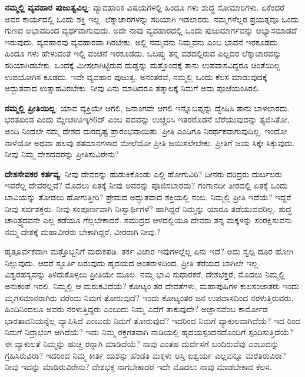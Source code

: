 \textbf{ನಮ್ಮಲ್ಲಿ ವ್ಯವಹಾರ ಪುಜುತ್ವವಿಲ್ಲ}: ವ್ಯಾವಹಾರಿಕ ವಿಷಯಗಳಲ್ಲಿ ಹಿಂದೂ ಗಳು ಶುದ್ಧ ಸೋಮಾರಿಗಳು. ಏಕೆಂದರೆ ಅವರ ಕಾರ್ಯದಲ್ಲಿ ಒಂದು ಶಕ್ತಿ ಇಲ್ಲ. ಲೆಕ್ಕಾಚಾರಗಳನ್ನು ಸರಿಯಾಗಿ ಇಡಲಾರರು. ನಮ್ಮಗಳೆಲ್ಲರ ಪ್ರಯತ್ನವೂ ಒಂದು ಗುಣದ ಅಭಾವದಿಂದ ವ್ಯರ್ಥವಾಗುವುದು. ಅದೇ ನಾವು ವ್ಯವಹಾರದಲ್ಲಿ ಒಂದು ಪುಜುಮಾರ್ಗವನ್ನು ಅಭ್ಯಾಸಮಾಡದೆ ಇರುವುದು. ವ್ಯವಹಾರವು ವ್ಯವಹಾರವಾ ಗಿರಬೇಕು. ಅಲ್ಲಿ ನಮ್ಮವನು ನಿಮ್ಮವನು ಎಂಬ ಭಾವನೆ ಇರಕೂಡದು. ಹಿಂದೂ ಗಳು ಹೇಳುವಂತೆ ಇಲ್ಲಿ ವಂಚನೆ ಇರಕೂಡದು. ಒಬಪ್ನು ತನ್ನ ವಶದಲ್ಲಿರುವ ಎಲ್ಲದರ ಲೆಕ್ಕಾಚಾರವನ್ನು ಸರಿಯಾಗಿಡಬೇಕು. ಒಂದಕ್ಕೆ ಮೀಸಲಾಗಿಟ್ಟಿರುವ ದುಡ್ಡನ್ನು ಮತ್ತೊಂದಕ್ಕೆ ತಾನು ಉಪವಾಸವಿದ್ದರೂ ಚಿಂತೆಯಿಲ್ಲ ಉಪಯೋಗಿಸ ಕೂಡದು. ಇದೇ ವ್ಯವಹಾರ ಪುಜುತ್ವ. ಅನಂತರವೆ, ನಮ್ಮಲ್ಲಿ ಒಂದು ಕೆಲಸ ಮಾಡುವುದಕ್ಕೆ ಅದ್ಭುತವಾದ ಉತ್ಸಾಹವಿರಬೇಕು. ನೀವು ಏನು ಮಾಡಿದರೂ ತತ್ಕಾಲಕ್ಕೆ ನಿಮಗೆ ಅದು ಪೂಜೆಯಂತಿರಲಿ.

\textbf{ನಮ್ಮಲ್ಲಿ ಪ್ರೀತಿಯಿಲ್ಲ}: ಯಾವ ವ್ಯಕ್ತಿಯೇ ಆಗಲಿ, ಜನಾಂಗವೇ ಆಗಲಿ ಇನ್ನೊಬಪ್ನನ್ನು ದ್ವೇಷಿಸಿ ತಾನು ಬಾಳಲಾರದು. ಭರತಖಂಡ ಎಂದು ಮ್ಲೇಚಊಇ್ಕ86ದ್ ಎಂಬ ಪದವನ್ನು ಉಚ್ಚರಿಸಿ ಇತರರೊಡನೆ ಬೆರೆಯುವುದನ್ನು ತ್ಯಜಿಸಿತೋ, ಅಂದಿ ನಿಂದಲೇ ನಮ್ಮ ದೇಶದ ದುರದೃಷ್ಟ ಪ್ರಾರಂಭವಾಯಿತು. ಪ್ರೀತಿ ಎಂದಿಗೂ ನಿರರ್ಥಕವಾಗುವುದಿಲ್ಲ. ಇಂದೋ ನಾಳೆಯೋ ಅಥವಾ ಹಲವು ಶತಮಾನಗಳಾದ ಮೇಲೆಯೋ ಪ್ರೀತಿ ಜಯಿಸಲೇಬೇಕು. ಪ್ರೀತಿಗೆ ಜಯ ಸಿಕ್ಕೇ ಸಿಕ್ಕುವುದು. ನೀವು ನಿಮ್ಮ ದೇಶದವರನ್ನು ಪ್ರೀತಿಸುವಿರೇನು?

\textbf{ದೇಶಸೇವಕರ ಕರ್ತವ್ಯ}: ನೀವು ದೇವರನ್ನು ಹುಡುಕಿಕೊಂಡು ಎಲ್ಲಿ ಹೋಗುವಿರಿ? ದೀನರು ದರಿದ್ರರು ದುರ್ಬಲರು ಇವರೆಲ್ಲ ದೇವರಲ್ಲವೆ? ಮೊದಲು ಏತಕ್ಕೆ ನೀವು ಅವರನ್ನು ಪೂಜಿಸಬಾರದು? ಗಂಗಾನದೀ ತೀರದಲ್ಲಿ ಏತಕ್ಕೆ ಒಂದು ಬಾವಿಯನ್ನು ತೋಡಲು ಹೋಗುತ್ತೀರಿ? ಪ್ರೇಮದ ಅದ್ಭುತವಾದ ಶಕ್ತಿಯಲ್ಲಿ ನಂಬಿ. ನಿಮ್ಮಲ್ಲಿ ಪ್ರೀತಿ ಇದೆಯೆ? ಇದ್ದರೆ ನೀವು ಸರ್ವಶಕ್ತರು. ನೀವು ಸಂಪೂರ್ಣವಾಗಿ ನಿಃಸ್ವಾರ್ಥಿಗಳೆ? ಹಾಗಿದ್ದರೆ ನಿಮ್ಮನ್ನು ಯಾರೂ ತಡೆಯುವವರಿಲ್ಲ. ಶುದ್ಧ ಚಾರಿತ್ರ್ಯದವನೇ ಎಲ್ಲ ಕಡೆಯೂ ಗೆಲ್ಲಬೇಕಾದರೆ. ಸಮುದ್ರದ ಆಳದಲ್ಲಿಯೂ ದೇವರು ತನ್ನ ಮಕ್ಕಳನ್ನು ಸಂರಕ್ಷಿಸುವನು. ನಮ್ಮ ದೇಶಕ್ಕೆ ಮಹಾವೀರರು ಬೇಕಾಗಿದ್ದರೆ, ವೀರರಾಗಿ ನೀವು.?

ಹೃತ್ಪೂರ್ವಕವಾಗಿ ಮತ್ತೊಬ್ಬನಿಗೆ ಮರುಕಪಡಿ. ತರ್ಕ ವಿಚಾರ ಇವುಗಳಲ್ಲೆಲ್ಲ ಏನು ಇದೆ? ಅದು ಸ್ವಲ್ಪ ದೂರ ಹೋಗಿ ನಿಲ್ಲುವುದು. ಆದರೆ ಸ್ಫೂರ್ತಿ ಬರುವುದು ಹೃದಯದ ಅಂತರಾಳದಿಂದ. ಪ್ರೀತಿ ತೆರೆಯದ ಬಾಗಿಲೇ ಇಲ್ಲ. ವಿಶ್ವರಹಸ್ಯವನ್ನು ತಿಳಿದುಕೊಳ್ಳಲು ಪ್ರೀತಿಯೇ ಮೂಲ. ನಮ್ಮ ಭಾವಿ ಸುಧಾರಕರೆ, ದೇಶಭಕ್ತರೆ, ಮೊದಲು ನಿಮ್ಮಲ್ಲಿ ಅನುಕಂಪೆ ಇರಲಿ. ನಿಮ್ಮಲ್ಲಿ ಆ ಮರುಕವಿದೆಯೆ? ಕೋಟ್ಯಂ ತರ ದೇವತೆಗಳು, ಮಹಾಪುಷಿಗಳ ಕುಲಸಂಜಾತರು ಇಂದು ಮೃಗಸಮಾನರಾಗಿರು ವರೆಂದು ನಿಮಗೆ ತೋರುವುದೆ? ಇಂದು ಕೋಟ್ಯಂತರ ಜನ ಉಪವಾಸದಿಂದ ನರಳುತ್ತಿರುವರು, ಹಿಂದಿನಿಂದಲೂ ಅವರು ನರಳುತ್ತಿದ್ದರು ಎಂಬುದು ನಿಮ್ಮ ಎದೆಗೆ ತಾಕುವುದೇ? ಅಜ್ಞಾನವೆಂಬ ಕಾರ್ಮೋಡ ಭಾರತಾವನಿಯನ್ನೆಲ್ಲ ವ್ಯಾಪಿಸಿದೆ ಎಂಬುದು ನಿಮಗೆ ತೋರುವುದೆ? ಇದರಿಂದ ನಿಮಗೆ ವ್ಯಾಕುಲವಾಗಿದೆಯೆ? ಇದ ರಿಂದ ನಿಮಗೆ ನಿದ್ರಾಭಂಗ ಆಗಿದೆಯೆ? ಇದು ನಿಮ್ಮ ರಕ್ತಗತವಾಗಿ ನಾಡಿಯಲ್ಲಿ ಹೃದಯಸ್ಪಂದನದೊಂದಿಗೆ ಸ್ಪಂದಿಸುತ್ತಿದೆಯೆ? ಈ ವ್ಯಾಕುಲತೆ ನಿಮ್ಮನ್ನು ಹುಚ್ಚ ರನ್ನಾಗಿ ಮಾಡಿದೆಯೆ? ನಾವು ಎಂತಹ ದುರ್ದೆಸೆಗೆ ಬಂದಿರುವೆವು ಎಂಬುದನ್ನು ಗ್ರಹಿಸಿರುವಿರಾ? ಇದರಿಂದ ನಿಮ್ಮ ಕೀರ್ತಿ ಯಶಸ್ಸು ಹೆಂಡತಿ ಮಕ್ಕಳು ಆಸ್ತಿ ಐಶ್ವರ್ಯ ಎಲ್ಲವನ್ನೂ ಮರೆತಿರುವಿರಾ? ನೀವು ಇದನ್ನು ಮಾಡಿರುವಿರೇನು? ದೇಶಭಕ್ತ ನಾಗಬೇಕಾದರೆ ಇದೇ ಮೊದಲು ನಾವು ಮಾಡಬೇಕಾದ ಕೆಲಸ.

